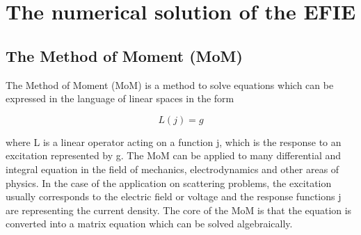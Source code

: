 \documentclass[a4paper,11pt]{thesis}
\begin{document}





\chapter{The numerical solution of the EFIE}
\section{The Method of Moment (MoM)}
The Method of Moment (MoM) is a method to solve equations which can be expressed in the language of linear spaces in the form

\begin{equation}\label{eq:linear_operator}
 L(j)=g
\end{equation}

where L is a linear operator acting on a function j, which is the response to an excitation represented by g. The MoM can be applied to many differential and integral equation in the field of mechanics, electrodynamics and other areas of physics. In the case of the application on scattering problems, the excitation usually corresponds to the electric field or voltage and the response functions j are representing the current density. The core of the MoM is that the equation is converted into a matrix equation which can be solved algebraically.\\
\end{document}
